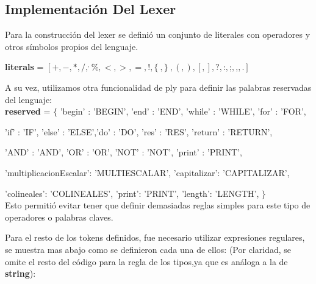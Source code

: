 \subsection{Implementación Del Lexer}

Para la construcción del lexer se definió un conjunto de literales con operadores y otros símbolos propios del lenguaje.

\textbf{literals} = $[+,- , * , / , ^ ,\% , < , > , = , ! , \{\ , \}\ , ( , ) , [ , ] , ? , \textbf{:} , \textbf{;} , \textbf{,} , \textbf{.} ]$

A su vez, utilizamos otra funcionalidad de ply para definir las palabras reservadas del lenguaje: \\

\textbf{reserved} = $\{$
'begin' : 'BEGIN', 'end' : 'END', 'while' : 'WHILE', 'for' : 'FOR',

'if' : 'IF', 'else' : 'ELSE','do' : 'DO', 'res' : 'RES', 'return' : 'RETURN',

'AND' : 'AND', 'OR' : 'OR', 'NOT' : 'NOT', 'print' : 'PRINT',

'multiplicacionEscalar': 'MULTIESCALAR', 'capitalizar': 'CAPITALIZAR', 

'colineales': 'COLINEALES', 'print': 'PRINT', 'length': 'LENGTH',
$\}$ \\

Esto permitió evitar tener que definir demasiadas reglas simples para este tipo de operadores o palabras claves.

Para el resto de los tokens definidos, fue necesario utilizar expresiones regulares, se muestra mas abajo como se definieron cada una de ellos: (Por claridad, se omite el resto del código para la regla de los tipos,ya que  es análoga a la de \textbf{string}):

